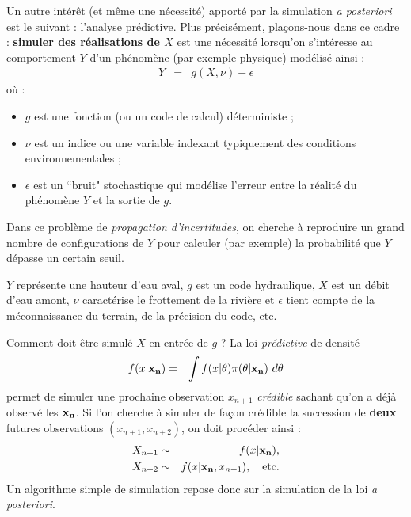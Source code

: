 Un autre intérêt (et même une nécessité) apporté par la simulation {\it a posteriori} est le suivant : l'analyse prédictive. Plus précisément, pla\c cons-nous dans ce cadre :  {\bf simuler des réalisations de $X$} est une nécessité lorsqu'on s'intéresse au comportement $Y$ d'un phénomène (par exemple physique) modélisé ainsi :
\begin{eqnarray*}
Y & = & g(X,\nu) + \epsilon
\end{eqnarray*}
où :
\begin{itemize}
\item $g$ est une fonction (ou un code de calcul) {déterministe} ;
\item $\nu$ est un indice ou une variable indexant typiquement des conditions environnementales ;
\item $\epsilon$ est un ``bruit" stochastique qui modélise l'erreur entre la réalité du phénomène $Y$ et la sortie de $g$.
\end{itemize}
Dans ce problème de \emph{propagation d'incertitudes}, on cherche à reproduire un grand nombre de configurations de $Y$ pour calculer (par exemple) la probabilité que $Y$ dépasse un certain seuil. \\ 

\begin{exo}
$Y$ représente une hauteur d'eau aval, $g$ est un code hydraulique, $X$ est un débit d'eau amont, $\nu$ caractérise le frottement de la rivière et $\epsilon$ tient compte de la méconnaissance du terrain, de la précision du code, etc. \\
\end{exo}

\noindent Comment doit être simulé $X$ en entrée de $g$ ? La loi \emph{prédictive} de densité
\begin{eqnarray*}
f(x|{\bf x_n}) & = & \int f(x|\theta) \pi(\theta|{\bf x_n}) \ d\theta
\end{eqnarray*}
 permet de simuler une prochaine observation $x_{n+1}$ \emph{\it crédible} sachant qu'on a déjà observé les ${\bf x_n}$. Si l'on cherche à simuler de façon crédible la succession de {\bf deux} futures observations $(x_{n+1},x_{n+2})$, on doit procéder ainsi :
\begin{eqnarray*}
X_{n+1} & \sim &  f(x|{\bf x_n}), \\
X_{n+2} & \sim &  f(x|{\bf x_n},x_{n+1}), \ \ \ \text{etc.}
\end{eqnarray*}
Un algorithme simple de simulation repose donc sur la simulation de la loi {\it a posteriori}. \\

